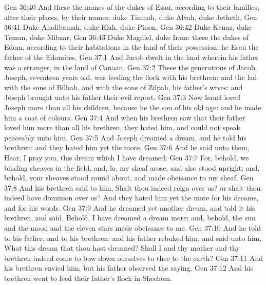 \vs Gen 36:40 And these  the names of the dukes  of Esau, according to their families, after their places, by their names; duke Timnah, duke Alvah, duke Jetheth,
\vs Gen 36:41 Duke Aholibamah, duke Elah, duke Pinon,
\vs Gen 36:42 Duke Kenaz, duke Teman, duke Mibzar,
\vs Gen 36:43 Duke Magdiel, duke Iram: these  the dukes of Edom, according to their habitations in the land of their possession: he  Esau the father of the Edomites.
\vs Gen 37:1 And Jacob dwelt in the land wherein his father was a stranger, in the land of Canaan.
\vs Gen 37:2 These  the generations of Jacob. Joseph,  seventeen years old, was feeding the flock with his brethren; and the lad  with the sons of Bilhah, and with the sons of Zilpah, his father's wives: and Joseph brought unto his father their evil report.
\vs Gen 37:3 Now Israel loved Joseph more than all his children, because he  the son of his old age: and he made him a coat of  colours.
\vs Gen 37:4 And when his brethren saw that their father loved him more than all his brethren, they hated him, and could not speak peaceably unto him.
\vs Gen 37:5 And Joseph dreamed a dream, and he told  his brethren: and they hated him yet the more.
\vs Gen 37:6 And he said unto them, Hear, I pray you, this dream which I have dreamed:
\vs Gen 37:7 For, behold, we  binding sheaves in the field, and, lo, my sheaf arose, and also stood upright; and, behold, your sheaves stood round about, and made obeisance to my sheaf.
\vs Gen 37:8 And his brethren said to him, Shalt thou indeed reign over us? or shalt thou indeed have dominion over us? And they hated him yet the more for his dreams, and for his words.
\vs Gen 37:9 And he dreamed yet another dream, and told it his brethren, and said, Behold, I have dreamed a dream more; and, behold, the sun and the moon and the eleven stars made obeisance to me.
\vs Gen 37:10 And he told  to his father, and to his brethren: and his father rebuked him, and said unto him, What  this dream that thou hast dreamed? Shall I and thy mother and thy brethren indeed come to bow down ourselves to thee to the earth?
\vs Gen 37:11 And his brethren envied him; but his father observed the saying.
\vs Gen 37:12 And his brethren went to feed their father's flock in Shechem.
